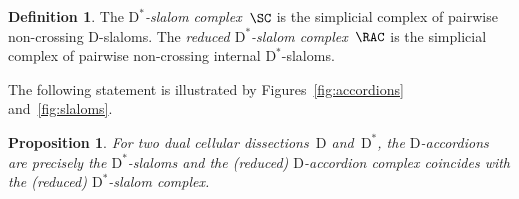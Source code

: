 \documentclass{amsart}
\newtheorem{proposition}[theorem]{Proposition}
\theoremstyle{definition}
\newtheorem{definition}[theorem]{Definition}
\newtheorem{remark}[theorem]{Remark}
\newcommand{\darkblue}{\color{darkblue}} %
\newcommand{\defn}[1]{\textsl{\darkblue #1}} %
\newcommand{\dual}{^*} %
\newcommand{\dissection}{\mathrm{D}} %
\begin{document}
\begin{definition}
\label{def:slalomComplex}
The \defn{$\dissection\dual$-slalom complex}~$\SC$ is the simplicial complex of pairwise non-crossing $\dissection$-slaloms.
The \defn{reduced $\dissection\dual$-slalom complex}~$\RAC$ is the simplicial complex of pairwise non-crossing internal $\dissection\dual$-slaloms.
\end{definition}


The following statement is illustrated by Figures~\ref{fig:accordions} and~\ref{fig:slaloms}.

\begin{proposition}
\label{prop:accordionsSlaloms}
For two dual cellular dissections~$\dissection$ and~$\dissection\dual$, the $\dissection$-accordions are precisely the $\dissection\dual$-slaloms and the (reduced) $\dissection$-accordion complex coincides with the (reduced) $\dissection\dual$-slalom complex.
\end{proposition}
\end{document}
